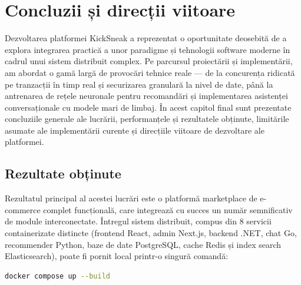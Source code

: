 \chapter{Concluzii și direcții viitoare}

Dezvoltarea platformei KickSneak a reprezentat o oportunitate deosebită de a explora integrarea practică a unor paradigme și tehnologii software moderne în cadrul unui sistem distribuit complex. Pe parcursul proiectării și implementării, am abordat o gamă largă de provocări tehnice reale --- de la concurența ridicată pe tranzacții în timp real și securizarea granulară la nivel de date, până la antrenarea de rețele neuronale pentru recomandări și implementarea asistenței conversaționale cu modele mari de limbaj. În acest capitol final sunt prezentate concluziile generale ale lucrării, performanțele și rezultatele obținute, limitările asumate ale implementării curente și direcțiile viitoare de dezvoltare ale platformei.

\section{Rezultate obținute}

Rezultatul principal al acestei lucrări este o platformă marketplace de e-commerce complet funcțională, care integrează cu succes un număr semnificativ de module interconectate. Întregul sistem distribuit, compus din 8 servicii containerizate distincte (frontend React, admin Next.js, backend .NET, chat Go, recommender Python, baze de date PostgreSQL, cache Redis și index search Elasticsearch), poate fi pornit local printr-o singură comandă:
\begin{lstlisting}[language=Bash]
docker compose up --build
\end{lstlisting}

